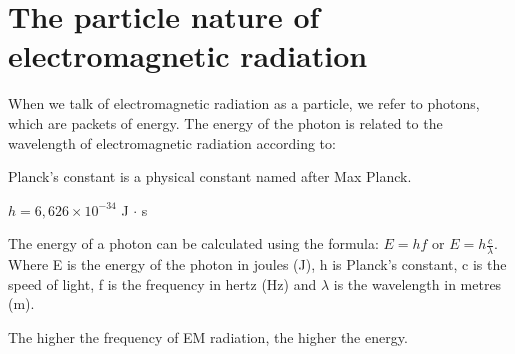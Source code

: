             \section{The particle nature of electromagnetic radiation}
            \nopagebreak
      \label{m38778*id188832}When we talk of electromagnetic radiation as a particle, we refer to photons, which are packets of energy. The energy of the photon is related to the wavelength of electromagnetic radiation according to:\par 
\label{m38778*fhsst!!!underscore!!!id476} { \label{m38778*meaningfhsst!!!underscore!!!id476}
      \label{m38778*id188843}Planck's constant is a physical constant named after Max Planck.\par 
      \label{m38778*id188849}$h=6,626\ensuremath{\times}{10}^{-34}$ J $\ensuremath{\cdot}$ s
 \par 
       } 
      \label{m38778*id188898}The energy of a photon can be calculated using the formula: $E=hf$ or $E=h\frac{c}{\lambda }$.
Where E is the energy of the photon in joules (J), h is Planck's constant, c is the speed of light, f is the frequency in hertz (Hz) and $\lambda $ is the wavelength in metres (m).\par The higher the frequency of EM radiation, the higher the energy. 
    
